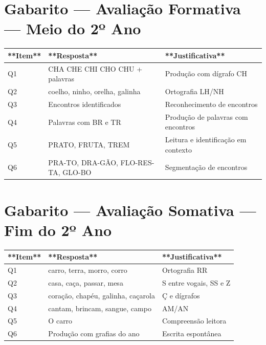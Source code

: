 \section{Gabarito --- Avaliação Formativa — Meio do 2º Ano}

\begin{center}
\renewcommand{\arraystretch}{1.5}
\begin{tabular}{lll}
\toprule
**Item** & **Resposta** & **Justificativa** \\
\midrule

Q1 & CHA CHE CHI CHO CHU + palavras & Produção com dígrafo CH \\

Q2 & coelho, ninho, orelha, galinha & Ortografia LH/NH \\

Q3 & Encontros identificados & Reconhecimento de encontros \\

Q4 & Palavras com BR e TR & Produção de palavras com encontros \\

Q5 & PRATO, FRUTA, TREM & Leitura e identificação em contexto \\

Q6 & PRA-TO, DRA-GÃO, FLO-RES-TA, GLO-BO & Segmentação de encontros \\

\bottomrule
\end{tabular}
\end{center}

\section{Gabarito --- Avaliação Somativa — Fim do 2º Ano}

\begin{center}
\renewcommand{\arraystretch}{1.5}
\begin{tabular}{lll}
\toprule
**Item** & **Resposta** & **Justificativa** \\
\midrule

Q1 & carro, terra, morro, corro & Ortografia RR \\

Q2 & casa, caça, passar, mesa & S entre vogais, SS e Z \\

Q3 & coração, chapéu, galinha, caçarola & Ç e dígrafos \\

Q4 & cantam, brincam, sangue, campo & AM/AN \\

Q5 & O carro & Compreensão leitora \\

Q6 & Produção com grafias do ano & Escrita espontânea \\

\bottomrule
\end{tabular}
\end{center}

